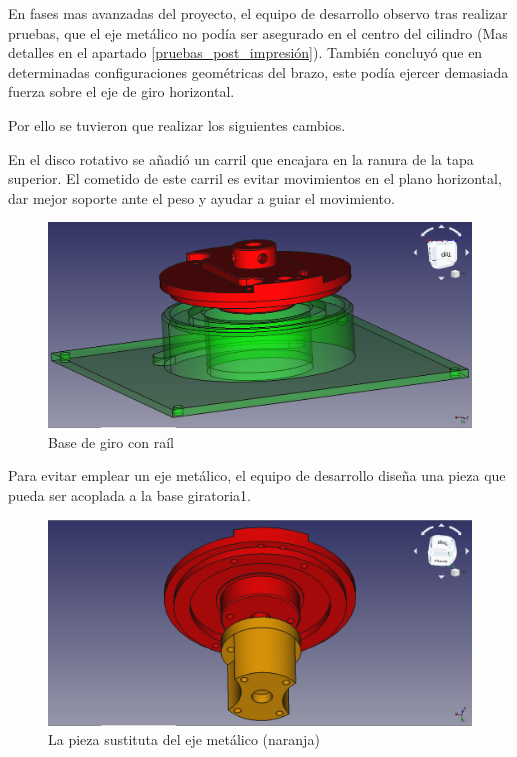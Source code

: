 En fases mas avanzadas del proyecto, el equipo de desarrollo observo tras realizar pruebas, que el eje metálico no podía ser asegurado en el centro del cilindro (Mas detalles en el apartado \ref{pruebas_post_impresión}). También concluyó que en determinadas configuraciones geométricas del brazo, este podía ejercer demasiada fuerza sobre el eje de giro horizontal.

Por ello se tuvieron que realizar los siguientes cambios.

En el disco rotativo se añadió un carril que encajara en la ranura de la tapa superior. El cometido de este carril es evitar movimientos en el plano horizontal, dar mejor soporte ante el peso y ayudar a guiar el movimiento.

\begin{figure}[H]
    \centering
    \includegraphics[width=.9\linewidth]{pictures/TapaConBaseRotatoria.png}
    \caption{Base de giro con raíl}
    \label{fig:base_de_giro_con_rail}
\end{figure}

Para evitar emplear un eje metálico, el equipo de desarrollo diseña una pieza que pueda ser acoplada a la base giratoria1.

\begin{figure}[H]
    \centering
    \includegraphics[width=.9\linewidth]{pictures/EjeMadeInElEquipoDeDesarrollo.png}
    \caption{La pieza sustituta del eje metálico (naranja)}
    \label{fig:pieza_sustituta_eje}
\end{figure}

